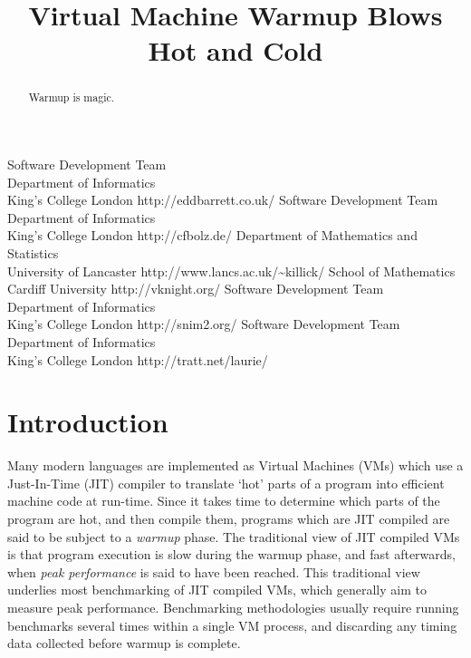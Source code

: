 \documentclass[10pt,preprint]{sigplanconf}
\begin{document}
\title{Virtual Machine Warmup Blows Hot and Cold}
           {Software Development Team\\ Department of Informatics\\ King's College London}
           {http://eddbarrett.co.uk/}
           {Software Development Team\\ Department of Informatics\\ King's College London}
           {http://cfbolz.de/}
           {Department of Mathematics and Statistics\\ University of Lancaster}
           {http://www.lancs.ac.uk/\~{}killick/}
           {School of Mathematics\\ Cardiff University}
           {http://vknight.org/}
           {Software Development Team\\ Department of Informatics\\ King's College London}
           {http://snim2.org/}
           {Software Development Team\\ Department of Informatics\\ King's College London}
           {http://tratt.net/laurie/}
\maketitle

\begin{abstract}
Warmup is magic.
\end{abstract}

\section{Introduction}
\label{sec:intro}


Many modern languages are implemented as Virtual Machines (VMs) which use a
Just-In-Time (JIT) compiler to translate `hot' parts of a program into efficient
machine code at run-time. Since it takes time to determine which parts of the
program are hot, and then compile them, programs which are JIT compiled are
said to be subject to a \emph{warmup} phase. The traditional view of
JIT compiled VMs is that program execution is slow during the warmup phase, and
fast afterwards, when \emph{peak performance} is said to have been reached.
This traditional view underlies most benchmarking of JIT compiled VMs, which
generally aim to measure peak performance. Benchmarking methodologies usually
require running benchmarks several times within a single VM process, and
discarding any timing data collected before warmup is complete.
\end{document}
